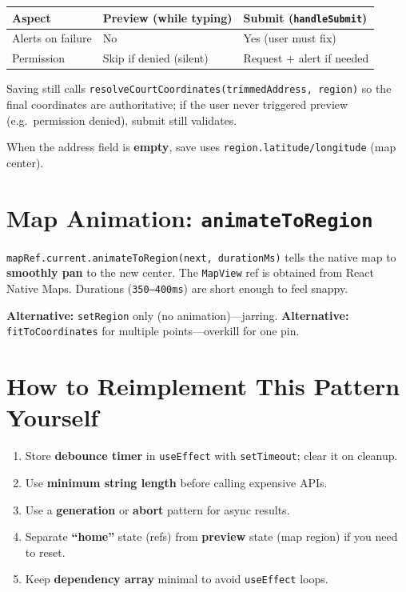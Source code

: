 \documentclass[11pt,a4paper]{article}
\begin{document}
\begin{center}
\begin{tabular}{@{}p{4.2cm}p{4.2cm}p{4.2cm}@{}}
\toprule
\textbf{Aspect} & \textbf{Preview (while typing)} & \textbf{Submit (\texttt{handleSubmit})} \\
\midrule
Alerts on failure & No & Yes (user must fix) \\
Permission & Skip if denied (silent) & Request + alert if needed \\
\bottomrule
\end{tabular}
\end{center}

Saving still calls \texttt{resolveCourtCoordinates(trimmedAddress, region)} so the final coordinates are authoritative; if the user never triggered preview (e.g.\ permission denied), submit still validates.

When the address field is \textbf{empty}, save uses \texttt{region.latitude/longitude} (map center).

\section{Map Animation: \texttt{animateToRegion}}

\texttt{mapRef.current.animateToRegion(next, durationMs)} tells the native map to \textbf{smoothly pan} to the new center. The \texttt{MapView} ref is obtained from React Native Maps. Durations (\texttt{350--400ms}) are short enough to feel snappy.

\textbf{Alternative:} \texttt{setRegion} only (no animation)---jarring. \textbf{Alternative:} \texttt{fitToCoordinates} for multiple points---overkill for one pin.

\section{How to Reimplement This Pattern Yourself}

\begin{enumerate}[noitemsep]
    \item Store \textbf{debounce timer} in \texttt{useEffect} with \texttt{setTimeout}; clear it on cleanup.
    \item Use \textbf{minimum string length} before calling expensive APIs.
    \item Use a \textbf{generation} or \textbf{abort} pattern for async results.
    \item Separate \textbf{``home''} state (refs) from \textbf{preview} state (map region) if you need to reset.
    \item Keep \textbf{dependency array} minimal to avoid \texttt{useEffect} loops.
\end{enumerate}
\end{document}
